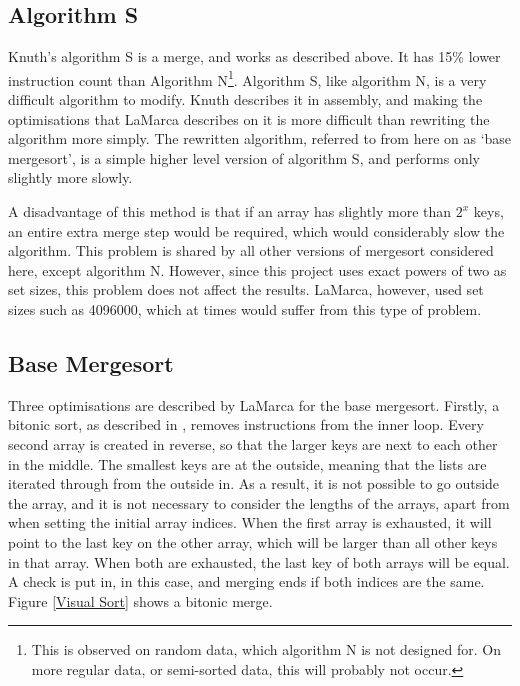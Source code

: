 \subsection{Algorithm S}

Knuth's algorithm S is a  merge, and works as described above. It has
15\% lower instruction count than Algorithm N\footnote{This is observed on
random data, which algorithm N is not designed for. On more regular data, or
semi-sorted data, this will probably not occur.}. Algorithm S, like algorithm N,
is a very difficult algorithm to modify. Knuth describes it in assembly, and
making the optimisations that LaMarca describes on it is more difficult than
rewriting the algorithm more simply. The rewritten algorithm, referred to from
here on as `base mergesort', is a simple higher level version of algorithm S,
and performs only slightly more slowly.

A disadvantage of this method is that if an array has slightly more than $2^x$
keys, an entire extra merge step would be required, which would considerably
slow the algorithm. This problem is shared by all other versions of mergesort
considered here, except algorithm N. However, since this project uses exact
powers of two as set sizes, this problem does not affect the results. LaMarca,
however, used set sizes such as 4096000, which at times would suffer from this
type of problem.

\subsection{Base Mergesort}
Three optimisations are described by LaMarca for the base mergesort. Firstly, a
bitonic sort, as described in \cite{Sedgewick02}, removes instructions from the
inner loop. Every second array is created in reverse, so that the larger keys  
are next to each other in the middle. The smallest keys are at the outside,
meaning that the lists are iterated through from the outside in. As a result, it
is not possible to go outside the array, and it is not necessary to consider the
lengths of the arrays, apart from when setting the initial array indices. When
the first array is exhausted, it will point to the last key on the other array,
which will be larger than all other keys in that array. When both are
exhausted, the last key of both arrays will be equal. A check is put in, in this
case, and merging ends if both indices are the same. Figure \vref{Visual Sort}
shows a bitonic merge.

